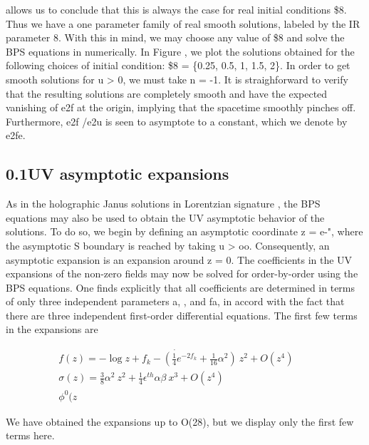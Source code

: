 \documentclass{article}
\begin{document}
\sloppy

allows us to conclude that this is always the case for real initial conditions \$8. Thus we
have a one parameter family of real smooth solutions, labeled by the IR parameter 8. With
this in mind, we may choose any value of \$8 and solve the BPS equations in numerically.
In Figure , we plot the solutions obtained for the following choices of initial condition:
\$8 = \{0.25, 0.5, 1, 1.5, 2\}. In order to get smooth solutions for u > 0, we must take n = -1.
It is straighforward to verify that the resulting solutions are completely smooth and have
the expected vanishing of e2f at the origin, implying that the spacetime smoothly pinches
off. Furthermore, e2f /e2u is seen to asymptote to a constant, which we denote by e2fe.


\subsection*{0.1UV asymptotic expansions}


As in the holographic Janus solutions in Lorentzian signature , the BPS equations may also
be used to obtain the UV asymptotic behavior of the solutions.  To do so, we begin by
defining an asymptotic coordinate z = e-", where the asymptotic S boundary is reached by
taking u > oo. Consequently, an asymptotic expansion is an expansion around z = 0. The
coefficients in the UV expansions of the non-zero fields may now be solved for order-by-order
using the BPS equations. One finds explicitly that all coefficients are determined in terms of
only three independent parameters a, , and fa, in accord with the fact that there are three
independent first-order differential equations. The first few terms in the expansions are


\begin{equation}
\begin{array} { c } { \dot { f ( z ) = - \log z + f _ { k } - \left ( \frac { 1 } { 4 } e ^ { - 2 f _ { k } } + \frac { 1 } { 1 6 } \alpha ^ { 2 } \right ) ~ z ^ { 2 } + O ( z ^ { 4 } ) } \quad } & { } \\ { \sigma ( z ) = \frac { 3 } { 8 } \alpha ^ { 2 } ~ z ^ { 2 } + \frac { 1 } { 4 } \epsilon ^ { t h } \alpha \beta ~ x ^ { 3 } + O ( z ^ { 4 } ) \quad } & { } \\ { \phi ^ { 0 } ( z}\end{array}
\end{equation}


We have obtained the expansions up to O(28), but we display only the first few terms here.
\end{document}
